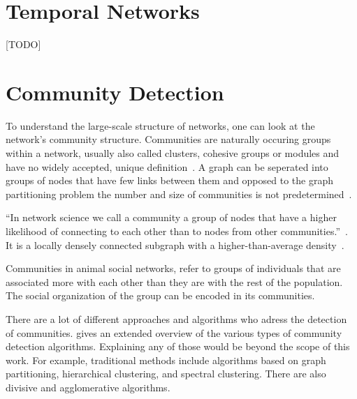 \section{Temporal Networks}
[TODO]

\section{Community Detection}
To understand the large-scale structure of networks, one can look at the network's community structure. Communities are naturally occuring groups within a network, usually also called clusters, cohesive groups or modules and have no widely accepted, unique definition~\cite{palla2005uncovering}.
A graph can be seperated into groups of nodes that have few links between them and opposed to the graph partitioning problem the number and size of communities is not predetermined~\cite[p.~371]{newman2010networks}.

``In network science we call a community a group of nodes that have a higher likelihood of connecting to each other than to nodes from other communities.''~\cite[p.~X]{barabasi2016network}. It is a locally densely connected subgraph with a higher-than-average density~\cite[p.~X]{barabasi2016network}.

Communities in animal social networks, refer to groups of individuals that are associated more with each other than they are with the rest of the population. The social organization of the group can be encoded in its communities.~\cite{croft2008exploring}

There are a lot of different approaches and algorithms who adress the detection of communities. \textcite{fortunato2010community} gives an extended overview of the various types of community detection algorithms.
Explaining any of those would be beyond the scope of this work. For example, traditional methods include algorithms based on graph partitioning, hierarchical clustering, and spectral clustering. There are also divisive and agglomerative algorithms.

